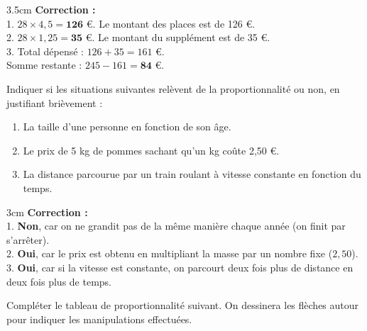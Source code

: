\documentclass[a4paper]{book}
\begin{document}
{\begin{exercice}
        \begin{ZoneReponse}{3.5cm}
            \textbf{Correction :} \\
            1. $28 \times 4,5 = \mathbf{126}$ \euro. Le montant des places est de 126 \euro. \\
            2. $28 \times 1,25 = \mathbf{35}$ \euro. Le montant du supplément est de 35 \euro. \\
            3. Total dépensé : $126 + 35 = 161$ \euro. \\
            Somme restante : $245 - 161 = \mathbf{84}$ \euro.
        \end{ZoneReponse}
    \end{exercice}
    

    \begin{exercice}
        Indiquer si les situations suivantes relèvent de la proportionnalité ou non, en justifiant brièvement :
        \begin{enumerate}
            \item La taille d'une personne en fonction de son âge.
            \item Le prix de 5 kg de pommes sachant qu'un kg coûte 2,50 \euro. 
            \item La distance parcourue par un train roulant à vitesse constante en fonction du temps.
        \end{enumerate}
        
        \begin{ZoneReponse}{3cm}
            \textbf{Correction :} \\
            1. \textbf{Non}, car on ne grandit pas de la même manière chaque année (on finit par s'arrêter). \\
            2. \textbf{Oui}, car le prix est obtenu en multipliant la masse par un nombre fixe ($2,50$). \\
            3. \textbf{Oui}, car si la vitesse est constante, on parcourt deux fois plus de distance en deux fois plus de temps.
        \end{ZoneReponse}
    \end{exercice}


\newpage


    \begin{exercice}
        Compléter le tableau de proportionnalité suivant. On dessinera les flèches autour pour indiquer les manipulations effectuées.
        

\end{exercice}}
\end{document}
